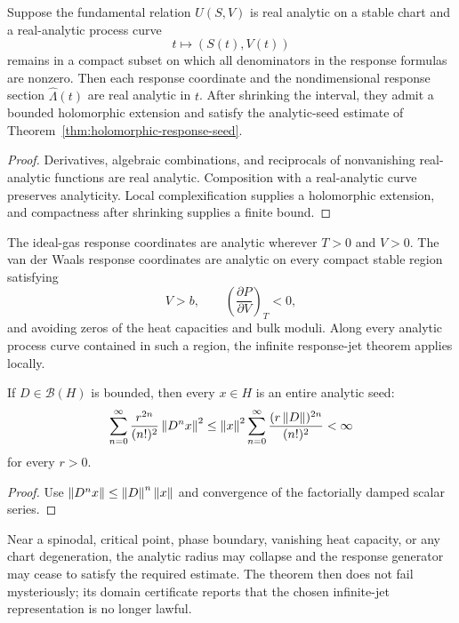 \begin{corollary}
Suppose the fundamental relation $U(S,V)$ is real analytic on a stable chart and a real-analytic process curve
\[
t\longmapsto(S(t),V(t))
\]
remains in a compact subset on which all denominators in the response formulas are nonzero.  Then each response coordinate and the nondimensional response section $\widehat\Lambda(t)$ are real analytic in $t$.  After shrinking the interval, they admit a bounded holomorphic extension and satisfy the analytic-seed estimate of Theorem~\ref{thm:holomorphic-response-seed}.
\end{corollary}

\begin{proof}
Derivatives, algebraic combinations, and reciprocals of nonvanishing real-analytic functions are real analytic.  Composition with a real-analytic curve preserves analyticity.  Local complexification supplies a holomorphic extension, and compactness after shrinking supplies a finite bound.
\end{proof}

\begin{corollary}
The ideal-gas response coordinates are analytic wherever $T>0$ and $V>0$.  The van der Waals response coordinates are analytic on every compact stable region satisfying
\[
V>b,
\qquad
\left(\frac{\partial P}{\partial V}\right)_T<0,
\]
and avoiding zeros of the heat capacities and bulk moduli.  Along every analytic process curve contained in such a region, the infinite response-jet theorem applies locally.
\end{corollary}

\begin{proposition}
If $D\in\mathcal B(H)$ is bounded, then every $x\in H$ is an entire analytic seed:
\begin{equation}
\sum_{n=0}^\infty
\frac{r^{2n}}{(n!)^2}\left\lVert D^nx\right\rVert^2
\le
\left\lVert x\right\rVert^2
\sum_{n=0}^\infty
\frac{(r\left\lVert D\right\rVert)^{2n}}{(n!)^2}
<\infty
\label{eq:bounded-generator-entire}
\end{equation}
for every $r>0$.
\end{proposition}

\begin{proof}
Use $\left\lVert D^nx\right\rVert\le\left\lVert D\right\rVert^n\left\lVert x\right\rVert$ and convergence of the factorially damped scalar series.
\end{proof}

\begin{remark}
Near a spinodal, critical point, phase boundary, vanishing heat capacity, or any chart degeneration, the analytic radius may collapse and the response generator may cease to satisfy the required estimate.  The theorem then does not fail mysteriously; its domain certificate reports that the chosen infinite-jet representation is no longer lawful.
\end{remark}
